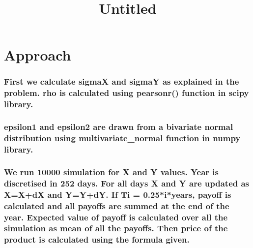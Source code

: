 \documentclass[11pt]{article}
\title{Untitled}
\begin{document}
    
    
    \maketitle
    
    

    
    \section{Approach}\label{approach}

    \subsubsection{First we calculate sigmaX and sigmaY as explained in the
problem. rho is calculated using pearsonr() function in scipy
library.}\label{first-we-calculate-sigmax-and-sigmay-as-explained-in-the-problem.-rho-is-calculated-using-pearsonr-function-in-scipy-library.}

\subsubsection{epsilon1 and epsilon2 are drawn from a bivariate normal
distribution using multivariate\_normal function in numpy
library.}\label{epsilon1-and-epsilon2-are-drawn-from-a-bivariate-normal-distribution-using-multivariate_normal-function-in-numpy-library.}

\subsubsection{We run 10000 simulation for X and Y values. Year is
discretised in 252 days. For all days X and Y are updated as X=X+dX and
Y=Y+dY. If Ti = 0.25*i*years, payoff is calculated and all payoffs are
summed at the end of the year. Expected value of payoff is calculated
over all the simulation as mean of all the payoffs. Then price of the
product is calculated using the formula
given.}\label{we-run-10000-simulation-for-x-and-y-values.-year-is-discretised-in-252-days.-for-all-days-x-and-y-are-updated-as-xxdx-and-yydy.-if-ti-0.25iyears-payoff-is-calculated-and-all-payoffs-are-summed-at-the-end-of-the-year.-expected-value-of-payoff-is-calculated-over-all-the-simulation-as-mean-of-all-the-payoffs.-then-price-of-the-product-is-calculated-using-the-formula-given.}
\end{document}

